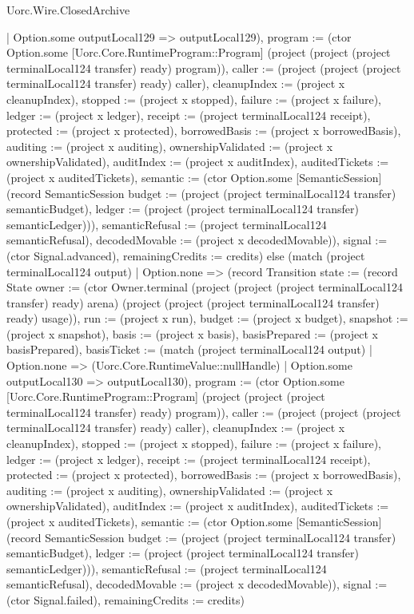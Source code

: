 \begin{lexlean}{Uorc.Wire.ClosedArchive}
\begin{semanticmodule}
{{{            | Option.some outputLocal129 => outputLocal129), program := (ctor Option.some [Uorc.Core.RuntimeProgram::Program] (project (project (project terminalLocal124 transfer) ready) program)), caller := (project (project (project terminalLocal124 transfer) ready) caller), cleanupIndex := (project x cleanupIndex), stopped := (project x stopped), failure := (project x failure), ledger := (project x ledger), receipt := (project terminalLocal124 receipt), protected := (project x protected), borrowedBasis := (project x borrowedBasis), auditing := (project x auditing), ownershipValidated := (project x ownershipValidated), auditIndex := (project x auditIndex), auditedTickets := (project x auditedTickets), semantic := (ctor Option.some [SemanticSession] (record SemanticSession {budget := (project (project terminalLocal124 transfer) semanticBudget), ledger := (project (project terminalLocal124 transfer) semanticLedger)})), semanticRefusal := (project terminalLocal124 semanticRefusal), decodedMovable := (project x decodedMovable)}), signal := (ctor Signal.advanced), remainingCredits := credits}) else (match (project terminalLocal124 output)
            | Option.none => (record Transition {state := (record State {owner := (ctor Owner.terminal (project (project (project terminalLocal124 transfer) ready) arena) (project (project (project terminalLocal124 transfer) ready) usage)), run := (project x run), budget := (project x budget), snapshot := (project x snapshot), basis := (project x basis), basisPrepared := (project x basisPrepared), basisTicket := (match (project terminalLocal124 output)
              | Option.none => (Uorc.Core.RuntimeValue::nullHandle)
              | Option.some outputLocal130 => outputLocal130), program := (ctor Option.some [Uorc.Core.RuntimeProgram::Program] (project (project (project terminalLocal124 transfer) ready) program)), caller := (project (project (project terminalLocal124 transfer) ready) caller), cleanupIndex := (project x cleanupIndex), stopped := (project x stopped), failure := (project x failure), ledger := (project x ledger), receipt := (project terminalLocal124 receipt), protected := (project x protected), borrowedBasis := (project x borrowedBasis), auditing := (project x auditing), ownershipValidated := (project x ownershipValidated), auditIndex := (project x auditIndex), auditedTickets := (project x auditedTickets), semantic := (ctor Option.some [SemanticSession] (record SemanticSession {budget := (project (project terminalLocal124 transfer) semanticBudget), ledger := (project (project terminalLocal124 transfer) semanticLedger)})), semanticRefusal := (project terminalLocal124 semanticRefusal), decodedMovable := (project x decodedMovable)}), signal := (ctor Signal.failed), remainingCredits := credits})
}
\end{semanticmodule}
\end{lexlean}
